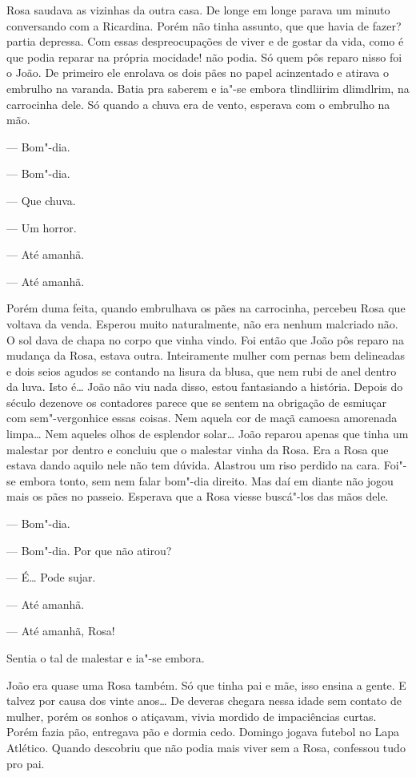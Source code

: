 Rosa saudava as vizinhas da outra casa. De longe em longe parava um
minuto conversando com a Ricardina. Porém não tinha assunto, que que
havia de fazer? partia depressa. Com essas despreocupações de viver e de
gostar da vida, como é que podia reparar na própria mocidade! não podia.
Só quem pôs reparo nisso foi o João. De primeiro ele enrolava os dois
pães no papel acinzentado e atirava o embrulho na varanda. Batia pra
saberem e ia"-se embora tlindliirim dlimdlrim, na carrocinha dele. Só
quando a chuva era de vento, esperava com o embrulho na mão.

--- Bom"-dia.

--- Bom"-dia.

--- Que chuva.

--- Um horror.

--- Até amanhã. 

--- Até amanhã.

Porém duma feita, quando embrulhava os pães na carrocinha, percebeu Rosa
que voltava da venda. Esperou muito naturalmente, não era nenhum
malcriado não. O sol dava de chapa no corpo que vinha vindo. Foi então
que João pôs reparo na mudança da Rosa, estava outra. Inteiramente
mulher com pernas bem delineadas e dois seios agudos se contando na
lisura da blusa, que nem rubi de anel dentro da luva. Isto é\ldots{} João não
viu nada disso, estou fantasiando a história. Depois do século dezenove
os contadores parece que se sentem na obrigação de esmiuçar com
sem"-vergonhice essas coisas. Nem aquela cor de maçã camoesa amorenada
limpa\ldots{} Nem aqueles olhos de esplendor solar\ldots{} João reparou apenas que
tinha um malestar por dentro e concluiu que o malestar vinha da Rosa.
Era a Rosa que estava dando aquilo nele não tem dúvida. Alastrou um riso
perdido na cara. Foi"-se embora tonto, sem nem falar bom"-dia direito. Mas
daí em diante não jogou mais os pães no passeio. Esperava que a Rosa
viesse buscá"-los das mãos dele.

--- Bom"-dia.

--- Bom"-dia. Por que não atirou?

--- É\ldots{} Pode sujar.

--- Até amanhã.

--- Até amanhã, Rosa!

Sentia o tal de malestar e ia"-se embora.

João era quase uma Rosa também. Só que tinha pai e mãe, isso ensina a
gente. E talvez por causa dos vinte anos\ldots{} De deveras chegara nessa
idade sem contato de mulher, porém os sonhos o atiçavam, vivia mordido
de impaciências curtas. Porém fazia pão, entregava pão e dormia cedo.
Domingo jogava futebol no Lapa Atlético. Quando descobriu que não podia
mais viver sem a Rosa, confessou tudo pro pai.

